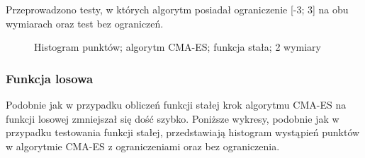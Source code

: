 \documentclass{mini}
\begin{document}
Przeprowadzono testy, w których algorytm posiadał ograniczenie [-3; 3] na obu wymiarach oraz test bez ograniczeń.

\begin{figure}[H]
\centering
{}
\quad
{}
\caption{Histogram punktów; algorytm CMA-ES; funkcja stała; 2 wymiary}
\end{figure}

\subsubsection*{Funkcja losowa}
Podobnie jak w przypadku obliczeń funkcji stałej krok algorytmu CMA-ES na funkcji losowej zmniejszał się dość szybko. Poniższe wykresy, podobnie jak w przypadku testowania funkcji stałej, przedstawiają histogram wystąpień punktów w algorytmie CMA-ES z ograniczeniami oraz bez ograniczenia.
\end{document}
